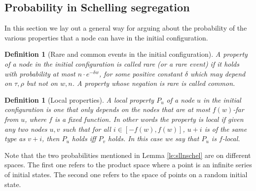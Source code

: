 \documentclass[11pt]{article}
\theoremstyle{plain}
\newtheorem{defi}[thm]{Definition}
\numberwithin{equation}{subsection}
\begin{document}
\subsection{Probability in Schelling segregation}
In this section we lay out a general way for arguing about the probability
of the various properties that a node can have in the initial configuration.

\begin{defi}[Rare and common events in the initial configuration]
A property of a node in the initial configuration is called rare 
(or a rare event) if it holds with 
probability at most $n\cdot e^{-\delta w}$,  
for some positive constant $\delta$ which may depend on $\tau,\rho$ but not on $w,n$.
A property whose negation is rare is called common.
\end{defi}


\begin{defi}[Local properties]\label{de:localevent}
A local property $P_u$ of a node $u$ in the initial configuration is one that
only depends on the nodes that are at most
$f(w)$-far from $u$, where $f$ is a fixed function.
In other words the property is local if given any two nodes $u,v$
such that for all $i \in [-f(w),f(w)]$, $u+i$ is of the same 
type as $v+i$, then $P_u$ holds iff $P_v$ holds.
In this case we say that $P_u$ is $f$-local.
\end{defi}

Note that the two probabilities mentioned in Lemma 
\ref{le:sllnschel} are on different spaces. The first one refers to the product space
where a point is an infinite series of initial states. The second one refers to
the space of points on a random initial state.
\end{document}
